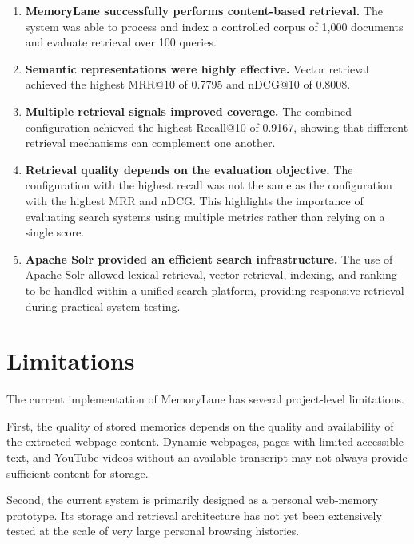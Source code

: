 \documentclass{tietreport}
\begin{document}
\begin{enumerate}

    \item \textbf{MemoryLane successfully performs
    content-based retrieval.}
    The system was able to process and index a controlled corpus
    of 1,000 documents and evaluate retrieval over 100 queries.

    \item \textbf{Semantic representations were highly
    effective.}
    Vector retrieval achieved the highest MRR@10 of 0.7795 and
    nDCG@10 of 0.8008.

    \item \textbf{Multiple retrieval signals improved
    coverage.}
    The combined configuration achieved the highest Recall@10
    of 0.9167, showing that different retrieval mechanisms can
    complement one another.

    \item \textbf{Retrieval quality depends on the evaluation
    objective.}
    The configuration with the highest recall was not the same
    as the configuration with the highest MRR and nDCG. This
    highlights the importance of evaluating search systems using
    multiple metrics rather than relying on a single score.

    \item \textbf{Apache Solr provided an efficient search
    infrastructure.}
    The use of Apache Solr allowed lexical retrieval, vector
    retrieval, indexing, and ranking to be handled within a
    unified search platform, providing responsive retrieval
    during practical system testing.

\end{enumerate}

\section{Limitations}

The current implementation of MemoryLane has several project-level
limitations.

First, the quality of stored memories depends on the quality and
availability of the extracted webpage content. Dynamic webpages,
pages with limited accessible text, and YouTube videos without an
available transcript may not always provide sufficient content for
storage.

Second, the current system is primarily designed as a personal
web-memory prototype. Its storage and retrieval architecture has
not yet been extensively tested at the scale of very large
personal browsing histories.
\end{document}
